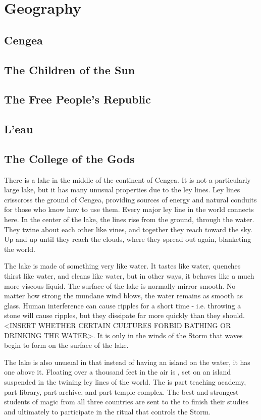 \documentclass[blue]{GL2020}
\begin{document}
\name{\bWorld{}}

\section*{Geography}
\subsection*{Cengea}
\subsection*{The Children of the Sun}
\subsection*{The Free People's Republic}
\subsection*{L'eau}
\subsection*{The College of the Gods}
There is a lake in the middle of the continent of Cengea. It is not a particularly large lake, but it has many unusual properties due to the ley lines. Ley lines crisscross the ground of Cengea, providing sources of energy and natural conduits for those who know how to use them. Every major ley line in the world connects here. In the center of the lake, the lines rise from the ground, through the water. They twine about each other like vines, and together they reach toward the sky. Up and up until they reach the clouds, where they spread out again, blanketing the world.

The lake is made of something very like water. It tastes like water, quenches thirst like water, and cleans like water, but in other ways, it behaves like a much more viscous liquid. The surface of the lake is normally mirror smooth. No matter how strong the mundane wind blows, the water remains as smooth as glass. Human interference can cause ripples for a short time - i.e. throwing a stone will cause ripples, but they dissipate far more quickly than they should. <INSERT WHETHER CERTAIN CULTURES FORBID BATHING OR DRINKING THE WATER>. It is only in the winds of the Storm that waves begin to form on the surface of the lake.

The lake is also unusual in that instead of having an island on the water, it has one above it. Floating over a thousand feet in the air is \pSchool{}, set on an island suspended in the twining ley lines of the world. The \pSchool{} is part teaching academy, part library, part archive, and part temple complex. The best and strongest students of magic from all three countries are sent to the \pSc{} to finish their studies and ultimately to participate in the ritual that controls the Storm.
\end{document}
